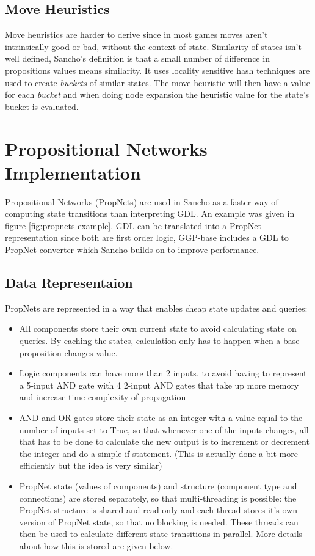 \subsection{Move Heuristics}
Move heuristics are harder to derive since in most games moves aren't intrinsically good or bad, without the context of state. 
Similarity of states isn't well defined, Sancho's definition is that a small number of difference in propositions values means similarity. 
It uses locality sensitive hash techniques are used to create \textit{buckets} of similar states.
The move heuristic will then have a value for each \textit{bucket} and when doing node expansion the heuristic value for the state's bucket is evaluated.


\section{Propositional Networks Implementation}

Propositional Networks (PropNets) are used in Sancho as a faster way of computing state transitions than interpreting GDL. An example was given in  figure \ref{fig:propnets example}.
GDL can be translated into a PropNet representation since both are first order logic, GGP-base includes a GDL to PropNet converter which Sancho builds on to improve performance.

\subsection{Data Representaion}
\noindent PropNets are represented in a way that enables cheap state updates and queries:
\begin{itemize}
	\item All components store their own current state to avoid calculating state on queries. By caching the states, calculation only has to happen when a base proposition changes value.
	
	\item Logic components can have more than 2 inputs, to avoid having to represent a 5-input AND gate with 4 2-input AND gates that take up more memory and increase time complexity of propagation
	
	\item AND and OR gates store their state as an integer with a value equal to the number of inputs set to True, so that whenever one of the inputs changes, all that has to be done to calculate the new output is to increment or decrement the integer and do a simple if statement. (This is actually done a bit more efficiently but the idea is very similar)
	
	\item PropNet state (values of components) and structure (component type and connections) are stored separately, so that multi-threading is possible: the PropNet structure is shared and read-only and each thread stores it's own version of PropNet state, so that no blocking is needed. These threads can then be used to calculate different state-transitions in parallel. More details about how this is stored are given below.
\end{itemize}

